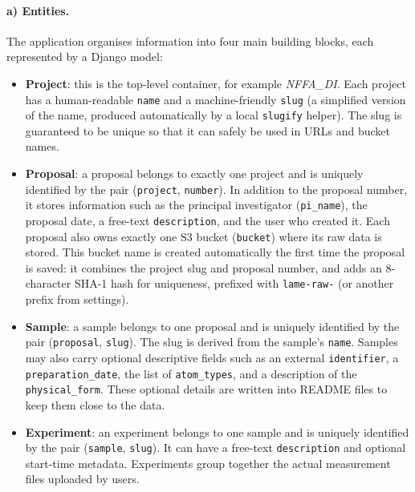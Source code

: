 \paragraph{a) Entities.}
The application organises information into four main building blocks, each represented by a Django model:

\begin{itemize}
	\item \textbf{Project}: this is the top-level container, for example \emph{NFFA\_DI}. 
	Each project has a human-readable \texttt{name} and a machine-friendly \texttt{slug} 
	(a simplified version of the name, produced automatically by a local \texttt{slugify} helper). 
	The slug is guaranteed to be unique so that it can safely be used in URLs and bucket names.
	
	\item \textbf{Proposal}: a proposal belongs to exactly one project and is uniquely identified by the pair 
	(\texttt{project}, \texttt{number}). In addition to the proposal number, it stores information such as the 
	principal investigator (\texttt{pi\_name}), the proposal date, a free-text \texttt{description}, and the user who created it. 
	Each proposal also owns exactly one S3 bucket (\texttt{bucket}) where its raw data is stored. 
	This bucket name is created automatically the first time the proposal is saved: 
	it combines the project slug and proposal number, and adds an 8-character SHA-1 hash for uniqueness, 
	prefixed with \texttt{lame-raw-} (or another prefix from settings).
	
	\item \textbf{Sample}: a sample belongs to one proposal and is uniquely identified by the pair 
	(\texttt{proposal}, \texttt{slug}). The slug is derived from the sample’s \texttt{name}. 
	Samples may also carry optional descriptive fields such as an external \texttt{identifier}, 
	a \texttt{preparation\_date}, the list of \texttt{atom\_types}, and a description of the \texttt{physical\_form}. 
	These optional details are written into README files to keep them close to the data.
	
	\item \textbf{Experiment}: an experiment belongs to one sample and is uniquely identified by the pair 
	(\texttt{sample}, \texttt{slug}). It can have a free-text \texttt{description} and optional start-time metadata. 
	Experiments group together the actual measurement files uploaded by users.
\end{itemize}

